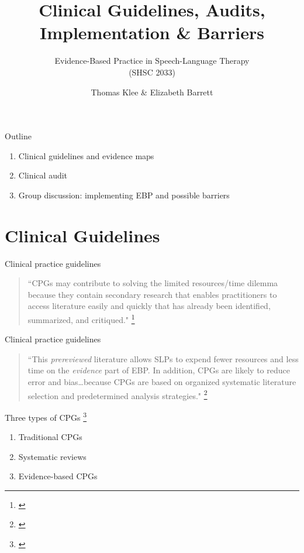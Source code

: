 \documentclass{beamer}
\title{Clinical Guidelines, Audits, \\ Implementation \& Barriers}
\subtitle{}
\author{Evidence-Based Practice in Speech-Language Therapy \\ (SHSC 2033)}
\institute{Session 10}
\date{Thomas Klee \& Elizabeth Barrett}
\begin{document}
\begin{frame}
	\titlepage
\end{frame}

% 
\begin{frame}{Outline}
	\begin{enumerate}
	\item Clinical guidelines and evidence maps
	\item Clinical audit	
	\item Group discussion: implementing EBP and possible barriers
	\end {enumerate}
\end{frame}

\section{Clinical Guidelines}

%
\begin{frame}
\center{\Huge{\textcolor{darkgray}{Clinical Guidelines}}}
\end{frame}

% 
\begin{frame}{Clinical practice guidelines}
	\begin{quote}
	``CPGs may contribute to solving the limited resources/time dilemma because they contain secondary research that enables practitioners to access literature easily and quickly that has already been identified, summarized, and critiqued." \footnote{\tiny{\citet[p. 290]{Hargrove2008}}}
	\end{quote}
\end{frame}

% 
\begin{frame}{Clinical practice guidelines}
	\begin{quote}
	``This \emph{prereviewed} literature allows SLPs to expend fewer resources and less time on the \emph{evidence} part of EBP. In addition, CPGs are likely to reduce error and bias\dots because CPGs are based on organized systematic literature selection and predetermined analysis strategies." \footnote{\tiny{\citet[p. 290]{Hargrove2008}}}
	\end{quote}
\end{frame}

% 
\begin{frame}{Three types of CPGs \footnote{\tiny{\citet[p. 290]{Hargrove2008}}}}
	\begin{enumerate}
	\item Traditional CPGs
	\item Systematic reviews
	\item Evidence-based CPGs
	\end{enumerate}
\end{frame}
\end{document}
